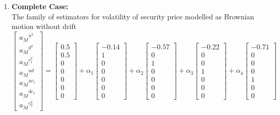 \documentclass[12pt]{article}   	%
\begin{document}
\begin{enumerate}
\item \textbf{Complete Case:}\\
The family of estimators for volatility of security price modelled as Brownian motion without drift
$$\begin{bmatrix}
{a_{M}}^{u^2}\\
{a_{M}}^{d^2}\\
{a_{M}}^{c_1^2}\\
{a_{M}}^{ud}\\
{a_{M}}^{uc_1}\\
{a_{M}}^{dc_1}\\
{a_{M}}^{c_0^2}
\end{bmatrix}=
\begin{bmatrix}
0.5\\
0.5\\
0\\
0\\
0\\
0\\
0
\end{bmatrix}+\alpha_1
\begin{bmatrix}
-0.14\\
1\\
0\\
0\\
0\\
0\\
0
\end{bmatrix}+\alpha_2
\begin{bmatrix}
-0.57\\
0\\
1\\
0\\
0\\
0\\
0
\end{bmatrix}
+\alpha_3
\begin{bmatrix}
-0.22\\
0\\
0\\
1\\
0\\
0\\
0
\end{bmatrix}
+\alpha_4
\begin{bmatrix}
-0.71\\
0\\
0\\
0\\
1\\
0\\
0
\end{bmatrix}
$$
\end{enumerate}
\end{document}

